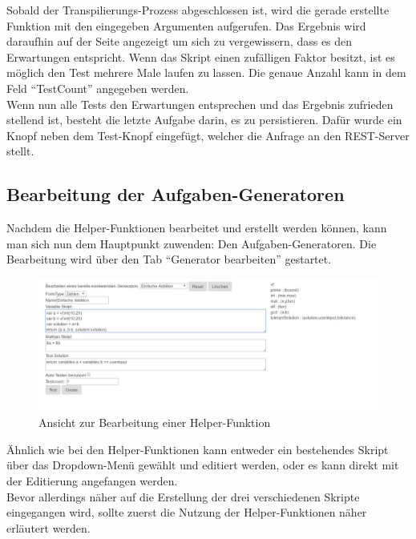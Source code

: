 Sobald der Transpilierungs-Prozess abgeschlossen ist, wird die gerade erstellte Funktion mit den eingegeben Argumenten aufgerufen. Das Ergebnis wird daraufhin auf der Seite angezeigt um sich zu vergewissern, dass es den Erwartungen entspricht.  Wenn das Skript einen zufälligen Faktor besitzt, ist es möglich den Test mehrere Male laufen zu lassen. Die genaue Anzahl kann in dem Feld ``TestCount'' angegeben werden. \\

Wenn nun alle Tests den Erwartungen entsprechen und das Ergebnis zufrieden stellend ist, besteht die letzte Aufgabe darin, es zu persistieren. Dafür wurde ein Knopf neben dem Test-Knopf eingefügt, welcher die Anfrage an den REST-Server stellt. \\

\subsection{Bearbeitung der Aufgaben-Generatoren}

Nachdem die Helper-Funktionen bearbeitet und erstellt werden können, kann man sich nun dem Hauptpunkt zuwenden: Den Aufgaben-Generatoren. Die Bearbeitung wird über den Tab ``Generator bearbeiten'' gestartet. \\

\begin{figure}[htp]     %
\centering
\includegraphics[width=1\textwidth]{bilder/EditScript} 
\caption[Ansicht zur Bearbeitung einer Helper-Funktion]{Ansicht zur Bearbeitung einer Helper-Funktion}
\end{figure} 

Ähnlich wie bei den Helper-Funktionen kann entweder ein bestehendes Skript über das Dropdown-Menü gewählt und editiert werden, oder es kann direkt mit der Editierung angefangen werden. \\

Bevor allerdings näher auf die Erstellung der drei verschiedenen Skripte eingegangen wird, sollte zuerst die Nutzung der Helper-Funktionen näher erläutert werden. \\

